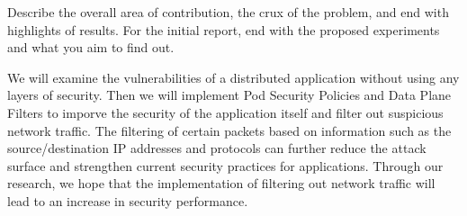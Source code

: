Describe the overall area of contribution, the crux of the problem,
and end with highlights of results. For the initial report, end with
the proposed experiments and what you aim to find out.

We will examine the vulnerabilities of a distributed application without using
any layers of security. Then we will implement Pod Security Policies and Data Plane Filters
to imporve the security of the application itself and filter out suspicious network traffic.
The filtering of certain packets based on information such as the source/destination
IP addresses and protocols can further reduce the attack surface and strengthen current security practices
for applications. Through our research, we hope that the implementation of filtering
out network traffic will lead to an increase in security performance.